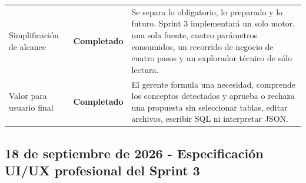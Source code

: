 \documentclass[11pt,letterpaper]{article}
\newcommand{\statusok}{\textcolor{deepgreen}{\textbf{Completado}}}
\begin{document}
\begin{longtable}{@{}p{}p{}p{}@{}}
  Simplificación de alcance & \statusok & Se separa lo obligatorio, lo preparado y lo futuro. Sprint 3 implementará un solo motor, una sola fuente, cuatro parámetros consumidos, un recorrido de negocio de cuatro pasos y un explorador técnico de sólo lectura. \\
  Valor para usuario final & \statusok & El gerente formula una necesidad, comprende los conceptos detectados y aprueba o rechaza una propuesta sin seleccionar tablas, editar archivos, escribir SQL ni interpretar JSON. \\
  \bottomrule
\end{longtable}

\clearpage
\subsection{18 de septiembre de 2026 - Especificación UI/UX profesional del Sprint 3}
\end{document}

